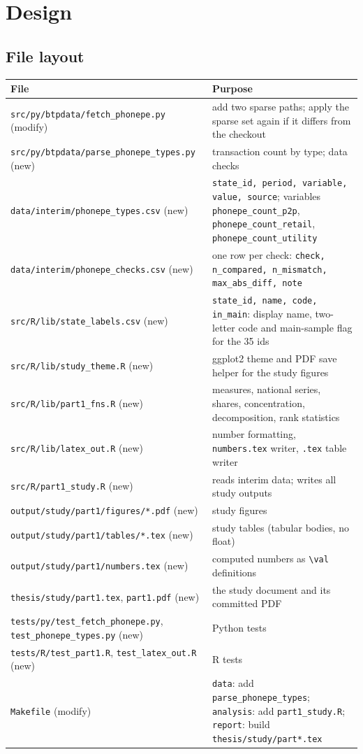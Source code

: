 \documentclass[11pt,a4paper]{article}
\newcommand{\f}[1]{\texttt{#1}}
\begin{document}
\section{Design}

\subsection{File layout}
\begin{tabularx}{\textwidth}{@{}l Y@{}}
\toprule
File & Purpose \\
\midrule
\f{src/py/btpdata/fetch\_phonepe.py} (modify) & add two sparse paths; apply the sparse set again if it
  differs from the checkout \\
\f{src/py/btpdata/parse\_phonepe\_types.py} (new) & transaction count by type; data checks \\
\f{data/interim/phonepe\_types.csv} (new) & \f{state\_id, period, variable, value, source};
  variables \f{phonepe\_count\_p2p}, \f{phonepe\_count\_retail}, \f{phonepe\_count\_utility} \\
\f{data/interim/phonepe\_checks.csv} (new) & one row per check: \f{check, n\_compared, n\_mismatch,
  max\_abs\_diff, note} \\
\f{src/R/lib/state\_labels.csv} (new) & \f{state\_id, name, code, in\_main}: display name, two-letter code
  and main-sample flag for the 35 ids \\
\f{src/R/lib/study\_theme.R} (new) & ggplot2 theme and PDF save helper for the study figures \\
\f{src/R/lib/part1\_fns.R} (new) & measures, national series, shares, concentration, decomposition,
  rank statistics \\
\f{src/R/lib/latex\_out.R} (new) & number formatting, \f{numbers.tex} writer, \f{.tex} table writer \\
\f{src/R/part1\_study.R} (new) & reads interim data; writes all study outputs \\
\f{output/study/part1/figures/*.pdf} (new) & study figures \\
\f{output/study/part1/tables/*.tex} (new) & study tables (tabular bodies, no float) \\
\f{output/study/part1/numbers.tex} (new) & computed numbers as \texttt{\textbackslash val} definitions \\
\f{thesis/study/part1.tex}, \f{part1.pdf} (new) & the study document and its committed PDF \\
\f{tests/py/test\_fetch\_phonepe.py}, \f{test\_phonepe\_types.py} (new) & Python tests \\
\f{tests/R/test\_part1.R}, \f{test\_latex\_out.R} (new) & R tests \\
\f{Makefile} (modify) & \f{data}: add \f{parse\_phonepe\_types}; \f{analysis}: add
  \f{part1\_study.R}; \f{report}: build \f{thesis/study/part*.tex} \\
\bottomrule
\end{tabularx}
\end{document}

